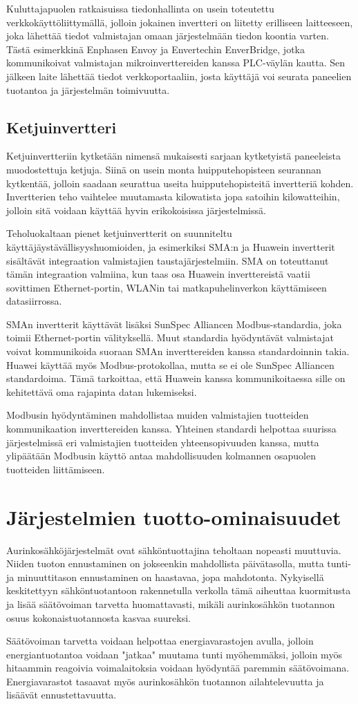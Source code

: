   Kuluttajapuolen ratkaisuissa tiedonhallinta on usein toteutettu verkkokäyttöliittymällä, jolloin jokainen invertteri on liitetty erilliseen laitteeseen, joka lähettää tiedot valmistajan omaan järjestelmään tiedon koontia varten. Tästä esimerkkinä Enphasen Envoy ja Envertechin EnverBridge, jotka kommunikoivat valmistajan mikroinverttereiden kanssa PLC-väylän kautta. Sen jälkeen laite lähettää tiedot verkkoportaaliin, josta käyttäjä voi seurata paneelien tuotantoa ja järjestelmän toimivuutta.

\subsection{Ketjuinvertteri}
  Ketjuinvertteriin kytketään nimensä mukaisesti sarjaan kytketyistä paneeleista muodostettuja ketjuja. Siinä on usein monta huipputehopisteen seurannan kytkentää, jolloin saadaan seurattua useita huipputehopisteitä invertteriä kohden. Invertterien teho vaihtelee muutamasta kilowatista jopa satoihin kilowatteihin, jolloin sitä voidaan käyttää hyvin erikokoisissa järjestelmissä.

  Teholuokaltaan pienet ketjuinvertterit on suunniteltu käyttäjäystävällisyyshuomioiden, ja esimerkiksi SMA:n ja Huawein invertterit sisältävät integraation valmistajien taustajärjestelmiin. SMA on toteuttanut tämän integraation valmiina, kun taas osa Huawein inverttereistä vaatii sovittimen Ethernet-portin, WLANin tai matkapuhelinverkon käyttämiseen datasiirrossa.

  SMAn invertterit käyttävät lisäksi SunSpec Alliancen Modbus-standardia, joka toimii Ethernet-portin välityksellä. Muut standardia hyödyntävät valmistajat voivat kommunikoida suoraan SMAn inverttereiden kanssa standardoinnin takia. Huawei käyttää myös Modbus-protokollaa, mutta se ei ole SunSpec Alliancen standardoima. Tämä tarkoittaa, että Huawein kanssa kommunikoitaessa sille on kehitettävä oma rajapinta datan lukemiseksi.

  Modbusin hyödyntäminen mahdollistaa muiden valmistajien tuotteiden kommunikaation inverttereiden kanssa. Yhteinen standardi helpottaa suurissa järjestelmissä eri valmistajien tuotteiden yhteensopivuuden kanssa, mutta ylipäätään Modbusin käyttö antaa mahdollisuuden kolmannen osapuolen tuotteiden liittämiseen.

\section{Järjestelmien tuotto-ominaisuudet}
  Aurinkosähköjärjestelmät ovat sähköntuottajina teholtaan nopeasti muuttuvia. Niiden tuoton ennustaminen on jokseenkin mahdollista päivätasolla, mutta tunti- ja minuuttitason ennustaminen on haastavaa, jopa mahdotonta. Nykyisellä keskitettyyn sähköntuotantoon rakennetulla verkolla tämä aiheuttaa kuormitusta ja lisää säätövoiman tarvetta huomattavasti, mikäli aurinkosähkön tuotannon osuus kokonaistuotannosta kasvaa suureksi.

  Säätövoiman tarvetta voidaan helpottaa energiavarastojen avulla, jolloin energiantuotantoa voidaan "jatkaa" muutama tunti myöhemmäksi, jolloin myös hitaammin reagoivia voimalaitoksia voidaan hyödyntää paremmin säätövoimana. Energiavarastot tasaavat myös aurinkosähkön tuotannon ailahtelevuutta ja lisäävät ennustettavuutta.
